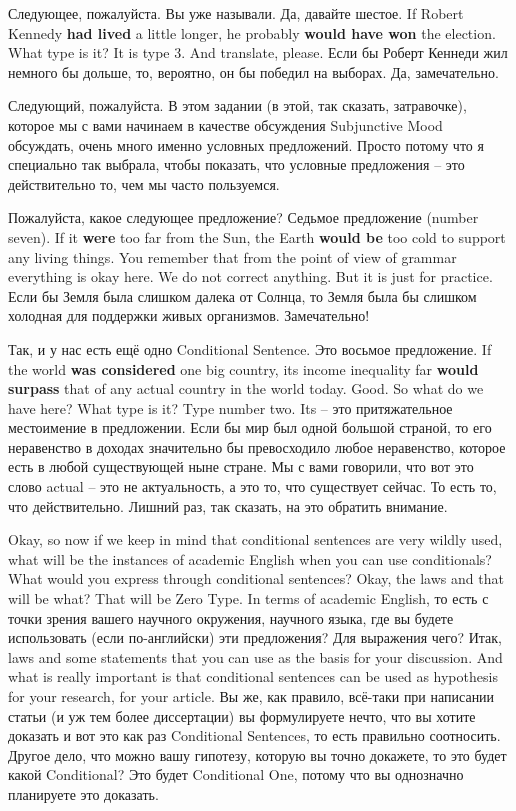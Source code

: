 \documentclass[main.tex]{subfiles}
\begin{document}
Следующее, пожалуйста.
Вы уже называли.
Да, давайте шестое.
If Robert Kennedy \textbf{had lived} a little longer, he probably \textbf{would have won} the election.
What type is it?
It is type 3.
And translate, please.
Если бы Роберт Кеннеди жил немного бы дольше, то, вероятно, он бы победил на выборах.
Да, замечательно.

Следующий, пожалуйста.
В этом задании (в этой, так сказать, затравочке), которое мы с вами начинаем в качестве обсуждения Subjunctive Mood обсуждать, очень много именно условных предложений.
Просто потому что я специально так выбрала, чтобы показать, что условные предложения -- это действительно то, чем мы часто пользуемся.

Пожалуйста, какое следующее предложение?
Седьмое предложение (number seven).
If it \textbf{were} too far from the Sun, the Earth \textbf{would be} too cold to support any living things.
You remember that from the point of view of grammar everything is okay here.
We do not correct anything.
But it is just for practice.
Если бы Земля была слишком далека от Солнца, то Земля была бы слишком холодная для поддержки живых организмов.
Замечательно!

Так, и у нас есть ещё одно Conditional Sentence.
Это восьмое предложение.
If the world \textbf{was considered} one big country, its income inequality far \textbf{would surpass} that of any actual country in the world today.
Good.
So what do we have here?
What type is it?
Type number two.
Its -- это притяжательное местоимение в предложении.
Если бы мир был одной большой страной, то его неравенство в доходах значительно бы превосходило любое неравенство, которое есть в любой существующей ныне стране.
Мы с вами говорили, что вот это слово actual -- это не актуальность, а это то, что существует сейчас.
То есть то, что действительно.
Лишний раз, так сказать, на это обратить внимание.

Okay, so now if we keep in mind that conditional sentences are very wildly used, what will be the instances of academic English when you can use conditionals?
What would you express through conditional sentences?
Okay, the laws and that will be what?
That will be Zero Type.
In terms of academic English, то есть с точки зрения вашего научного окружения, научного языка, где вы будете использовать (если по-английски) эти предложения?
Для выражения чего?
Итак, laws and some statements that you can use as the basis for your discussion.
And what is really important is that conditional sentences can be used as hypothesis for your research, for your article.
Вы же, как правило, всё-таки при написании статьи (и уж тем более диссертации) вы формулируете нечто, что вы хотите доказать и вот это как раз Conditional Sentences, то есть правильно соотносить.
Другое дело, что можно вашу гипотезу, которую вы точно докажете, то это будет какой Conditional?
Это будет Conditional One, потому что вы однозначно планируете это доказать.
\end{document}

